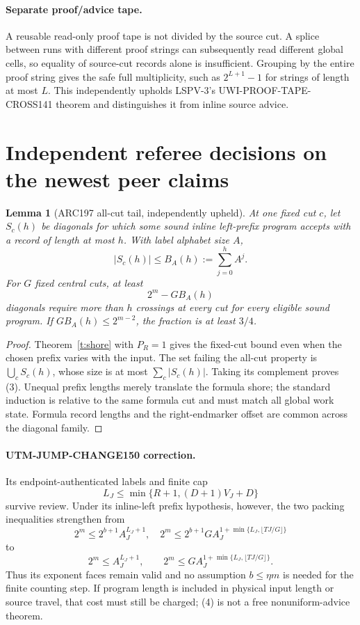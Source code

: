 \documentclass[11pt]{article}
\newtheorem{lemma}[theorem]{Lemma}
\begin{document}
\paragraph{Separate proof/advice tape.}
A reusable read-only proof tape is not divided by the source cut.  A splice
between runs with different proof strings can subsequently read different
global cells, so equality of source-cut records alone is insufficient.
Grouping by the entire proof string gives the safe full multiplicity, such
as $2^{L+1}-1$ for strings of length at most $L$.  This independently
upholds LSPV-3's UWI-PROOF-TAPE-CROSS141 theorem and distinguishes it from
inline source advice.

\section{Independent referee decisions on the newest peer claims}
\begin{lemma}[ARC197 all-cut tail, independently upheld]
At one fixed cut $c$, let $S_c(h)$ be diagonals for which some sound inline
left-prefix program accepts with a record of length at most $h$.  With label
alphabet size $A$,
\[
 |S_c(h)|\le B_A(h):=\sum_{j=0}^{h}A^j.
\]
For $G$ fixed central cuts, at least
\[
 2^m-G B_A(h)                                            \tag{3}
\]
diagonals require more than $h$ crossings at \emph{every} cut for every
eligible sound program.  If $GB_A(h)\le2^{m-2}$, the fraction is at least
$3/4$.
\end{lemma}
\begin{proof}
Theorem~\ref{t:shore} with $P_R=1$ gives the fixed-cut bound even when the
chosen prefix varies with the input.  The set failing the all-cut property
is $\bigcup_c S_c(h)$, whose size is at most $\sum_c|S_c(h)|$.  Taking its
complement proves (3).  Unequal prefix lengths merely translate the formula
shore; the standard induction is relative to the same formula cut and must
match all global work state.  Formula record lengths and the right-endmarker
offset are common across the diagonal family.
\end{proof}

\paragraph{UTM-JUMP-CHANGE150 correction.}
Its endpoint-authenticated labels and finite cap
\[
 L_J\le\min\{R+1,(D+1)V_J+D\}
\]
survive review.  Under its inline-left prefix hypothesis, however, the two
packing inequalities strengthen from
\[
2^m\le2^{b+1}A_J^{L_J+1},\quad
2^m\le2^{b+1}G A_J^{1+\min\{L_J,\lfloor TJ/G\rfloor\}}
\]
to
\[
\boxed{2^m\le A_J^{L_J+1}},\qquad
\boxed{2^m\le G A_J^{1+\min\{L_J,\lfloor TJ/G\rfloor\}}}. \tag{4}
\]
Thus its exponent faces remain valid and no assumption $b\le\eta m$ is
needed for the finite counting step.  If program length is included in
physical input length or source travel, that cost must still be charged;
(4) is not a free nonuniform-advice theorem.
\end{document}
